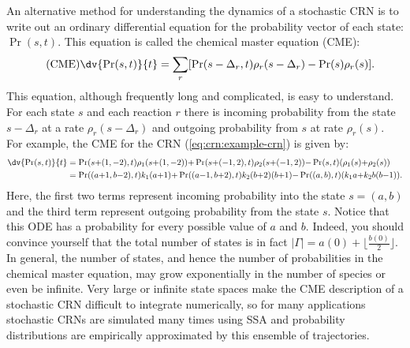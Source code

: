 An alternative method for understanding the dynamics of a stochastic CRN is to write out an ordinary differential equation for the probability vector of each state: $\Pr(s, t)$.
This equation is called the chemical master equation (CME):
%
\begin{align}
    \tag{CME}
    \dv{\Pr(s, t)}{t} &= \sum_r [\Pr(s-\Delta_r, t) \rho_r(s - \Delta_r) - \Pr(s) \rho_r(s)].
    \label{eq:crn:cme}
\end{align}
%
This equation, although frequently long and complicated, is easy to understand. For each state $s$ and each reaction $r$ there is incoming probability from the state $s-\Delta_r$ at a rate $\rho_r(s-\Delta_r)$ and outgoing probability from $s$ at rate $\rho_r(s)$. For example, the CME for the CRN (\ref{eq:crn:example-crn}) is given by:
%
{\small\begin{align*}
  \smash{\dv{\Pr(s, t)}{t}}
    &= \Pr(s {+} (1, -2), t) \rho_1(s {+} (1, -2)) 
     {+} \Pr(s {+} (-1, 2), t) \rho_2(s {+} (-1, 2))
     {-} \Pr(s, t)(\rho_1(s) {+} \rho_2(s)) \\
    &= \Pr((a{+}1, b{-}2), t) k_1 (a{+}1)
    {+} \Pr((a{-}1, b{+}2), t) k_2 (b{+}2)(b{+}1)
    {-} \Pr((a, b), t)(k_1 a {+} k_2 b (b{-}1)).
\end{align*}}
%
Here, the first two terms represent incoming probability into the state $s = (a, b)$ and the third term represent outgoing probability from the state $s$. Notice that this ODE has a probability for every possible value of $a$ and $b$. Indeed, you should convince yourself that the total number of states is in fact $|\Gamma| = a(0) + \lfloor \frac{b(0)}{2} \rfloor.$ In general, the number of states, and hence the number of probabilities in the chemical master equation, may grow exponentially in the number of species or even be infinite. Very large or infinite state spaces make the CME description of a stochastic CRN difficult to integrate numerically, so for many applications stochastic CRNs are simulated many times using SSA and probability distributions are empirically approximated by this ensemble of trajectories.
%
